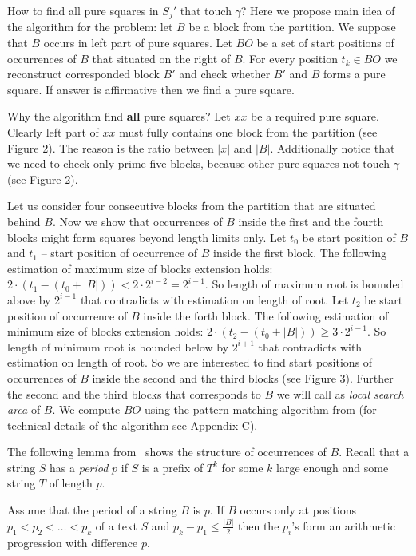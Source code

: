 \documentclass[11pt]{article}
\begin{document}
How to find all pure squares in $S_j'$ that touch $\gamma$? Here we propose main idea of the algorithm for the
problem: let $B$ be a block from the partition. We suppose that $B$ occurs in left part of pure squares. Let $BO$
be a set of start positions of occurrences of $B$ that situated on the right of $B$. For every position $t_k \in
BO$ we reconstruct corresponded block $B'$ and check whether $B'$ and $B$ forms a pure square. If answer is
affirmative then we find a pure square.

Why the algorithm find {\bf all} pure squares? Let $xx$ be a required pure square. Clearly left part of $xx$ must
fully contains one block from the partition (see Figure 2). The reason is the ratio between $|x|$ and $|B|$.
Additionally notice that we need to check only prime five blocks, because other pure squares not touch $\gamma$
(see Figure 2).

Let us consider four consecutive blocks from the partition that are situated behind $B$. Now we show that
occurrences of $B$ inside the first and the fourth blocks might form squares beyond length limits only. Let $t_0$
be start position of $B$ and $t_1$ -- start position of occurrence of $B$ inside the first block. The following
estimation of maximum size of blocks extension holds: $2 \cdot (t_1 - (t_0 + |B|)) < 2 \cdot 2^{i-2} = 2^{i-1}$.
So length of maximum root is bounded above by $2^{i-1}$ that contradicts with estimation on length of root. Let
$t_2$ be start position of occurrence of $B$ inside the forth block. The following estimation of minimum size of
blocks extension holds: $2 \cdot (t_2 - (t_0 + |B|)) \geq 3 \cdot 2^{i-1}$. So length of minimum root is bounded
below by $2^{i+1}$ that contradicts with estimation on length of root. So we are interested to find start
positions of occurrences of $B$ inside the second and the third blocks (see Figure 3). Further the second and the
third blocks that corresponds to $B$ we will call as \emph{local search area} of $B$. We compute $BO$ using the
pattern matching algorithm from \cite{15} (for technical details of the algorithm see Appendix C).

The following lemma from~\cite{2} shows the structure of occurrences of $B$. Recall that a string $S$ has a
\emph{period} $p$ if $S$ is a prefix of $T^k$ for some $k$ large enough and some string $T$ of length $p$.

\begin{lem}[{\rm\cite{2}}]
Assume that the period of a string $B$ is $p$. If $B$ occurs only
at positions $p_1 < p_2 < \dots < p_k$ of a text $S$ and $p_k -
p_1 \leq \frac{|B|}{2}$ then the $p_i$'s form an arithmetic
progression with difference $p$.
\end{lem}
\end{document}
